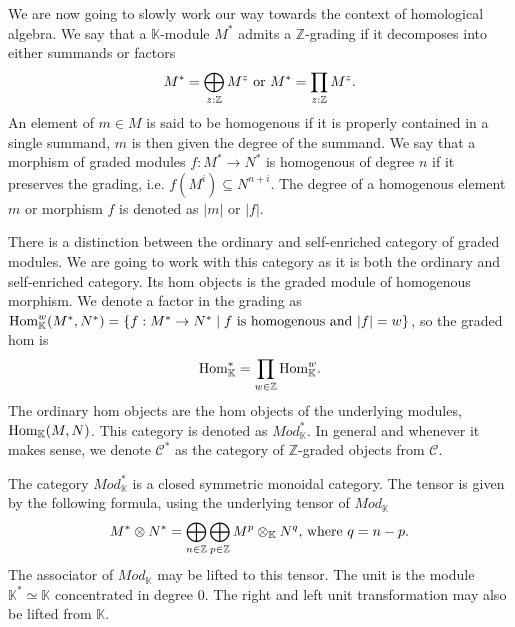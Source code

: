 \documentclass[../thesis.tex]{subfiles}
\begin{document}
            We are now going to slowly work our way towards the context of homological algebra. We say that a $\mathbb{K}$-module $M^*$ admits a $\mathbb{Z}$-grading if it decomposes into either summands or factors
            \begin{align*}
                M^* = \bigoplus_{z:\mathbb{Z}}M^z\tt{ or } M^* = \prod_{z:\mathbb{Z}}M^z\tt{.}
            \end{align*}
            An element of $m\in M$ is said to be homogenous if it is properly contained in a single summand, $m$ is then given the degree of the summand. We say that a morphism of graded modules $f:M^*\rightarrow N^*$ is homogenous of degree $n$ if it preserves the grading, i.e.  $f(M^i) \subseteq N^{n+i}$. The degree of a homogenous element $m$ or morphism $f$ is denoted as $|m|$ or $|f|$.
            
            There is a distinction between the ordinary and self-enriched category of graded modules. We are going to work with this category as it is both the ordinary and self-enriched  category. Its hom objects is the graded module of homogenous morphism. We denote a factor in the grading as $\tt{Hom}_\mathbb{K}^w(M^*,N^*)=\startset{f : M^* \rightarrow N^* \mid f\tt{ is homogenous and }|f|=w}$, so the graded hom is
            \begin{align*}
                \tt{Hom}_\mathbb{K}^* = \prod_{w\in\mathbb{Z}}\tt{Hom}_\mathbb{K}^w\tt{.}
            \end{align*}
            The ordinary hom objects are the hom objects of the underlying modules, $\tt{Hom}_\mathbb{K}(M,N)$. This category is denoted as $Mod_\mathbb{K}^*$. In general and whenever it makes sense, we denote $\mathcal{C}^*$ as the category of $\mathbb{Z}$-graded objects from $\mathcal{C}$.

            The category $Mod_\mathbb{K}^*$ is a closed symmetric monoidal category. The tensor is given by the following formula, using the underlying tensor of $Mod_\mathbb{K}$
            \begin{align*}
                M^*\otimes N^* = \bigoplus_{n\in \mathbb{Z}}\bigoplus_{p\in\mathbb{Z}}M^p\otimes_\mathbb{K} N^q\tt{, where }q = n - p\tt{.}
            \end{align*}
            The associator of $Mod_\mathbb{K}$ may be lifted to this tensor. The unit is the module $\mathbb{K}^* \simeq \mathbb{K}$ concentrated in degree $0$. The right and left unit transformation may also be lifted from $\mathbb{K}$. 
            
\end{document}
